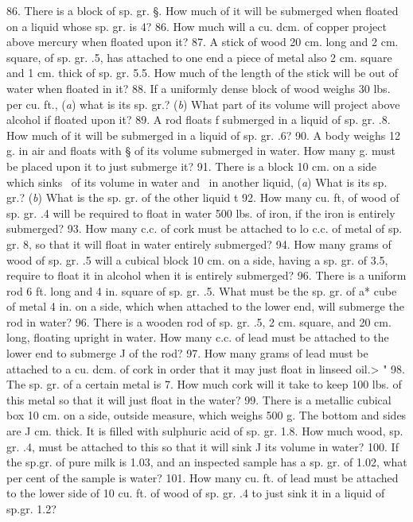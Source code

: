 86. There is a block of sp. gr. §. How much of it will be submerged when floated on a liquid whose sp. gr. is 4?
86. How much will a cu. dcm. of copper project above mercury when floated upon it?
87. A stick of wood 20 cm. long and 2 cm. square, of sp. gr. .5, has attached to one end a piece of metal also 2 cm. square and 1 cm. thick of sp. gr. 5.5. How much of the length of the stick will be out of water when floated in it?
88. If a uniformly dense block of wood weighs 30 lbs. per cu. ft., (\emph{a}) what is its sp. gr.? (\emph{b}) What part of its volume will project above alcohol if floated upon it?
89. A rod floats f submerged in a liquid of sp. gr. .8. How much of it will be submerged in a liquid of sp. gr. .6?
90. A body weighs 12 g. in air and floats with § of its volume submerged in water. How many g. must be placed upon it to just submerge it?
91. There is a block 10 cm. on a side which sinks \ of its volume in water and \ in another liquid, (\emph{a}) What is its sp. gr.? (\emph{b}) What is the sp. gr. of the other liquid t
92. How many cu. ft, of wood of sp. gr. .4 will be required to float in water 500 lbs. of iron, if the iron is entirely submerged?
93. How many c.c. of cork must be attached to lo c.c. of metal of sp. gr. 8, so that it will float in water entirely submerged?
94. How many grams of wood of sp. gr. .5 will a cubical block 10 cm. on a side, having a sp. gr. of 3.5, require to float it in alcohol when it is entirely submerged?
96. There is a uniform rod 6 ft. long and 4 in. square of sp. gr. .5. What must be the sp. gr. of a* cube of metal 4 in. on a side, which when attached to the lower end, will submerge the rod in water?
96. There is a wooden rod of sp. gr. .5, 2 cm. square, and 20 cm. long, floating upright in water. How many c.c. of lead must be attached to the lower end to submerge J of the rod?
97. How many grams of lead must be attached to a cu. dcm. of cork in order that it may just float in linseed oil.> "
98. The sp. gr. of a certain metal is 7. How much cork will it take to keep 100 lbs. of this metal so that it will just float in the water?
99. There is a metallic cubical box 10 cm. on a side, outside measure, which weighs 500 g. The bottom and sides are J cm. thick. It is filled with sulphuric acid of sp. gr. 1.8. How much wood, sp. gr. .4, must be attached to this so that it will sink J its volume in water?
100. If the sp.gr. of pure milk is 1.03, and an inspected sample has a sp. gr. of 1.02, what per cent of the sample is water?
101. How many cu. ft. of lead must be attached to the lower side of 10 cu. ft. of wood of sp. gr. .4 to just sink it in a liquid of sp.gr. 1.2?
